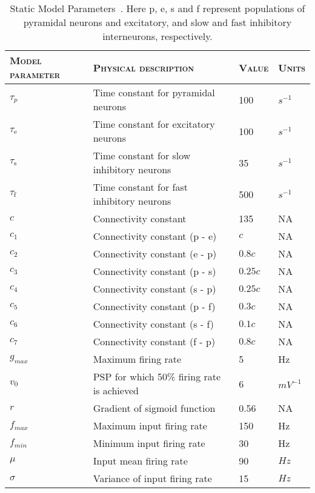 \singlespacing
\small
\begin{center}%
	\begin{table}
			\caption{Static Model Parameters~\citep{wendling2002epileptic}. Here p, e, s and f represent populations of pyramidal neurons and excitatory, and slow and fast inhibitory interneurons, respectively.}
		\begin{tabular}{||p{4cm}|p{6cm}|p{1.5cm}|p{1.2cm}||}\hline
			 \textsc{Model parameter}  & \textsc{Physical description} & \textsc{Value} & \textsc{Units}  \\\hline\hline
			 $\tau_{p}$ & Time constant for pyramidal neurons & 100 & $s^{-1}$\\\hline
			 $\tau_{\mathrm{e}}$ & Time constant for excitatory neurons & 100 & $s^{-1}$\\\hline
			 $\tau_{\mathrm{s}}$ & Time constant for slow inhibitory neurons & 35 & $s^{-1}$\\\hline
			 $\tau_{\mathrm{f}}$ & Time constant for fast inhibitory neurons & 500 & $s^{-1}$\\\hline
			 $c$ & Connectivity constant & 135 & NA\\\hline
			 $c_{1}$ & Connectivity constant (p - e) & $c$ & NA \\\hline
			 $c_{2}$ & Connectivity constant (e - p) & $0.8c$ & NA\\\hline
			 $c_{3}$ & Connectivity constant (p - s) & $0.25c$ & NA \\\hline
			 $c_{4}$ & Connectivity constant (s - p)& $0.25c$ & NA\\\hline
			 $c_{5}$ & Connectivity constant (p - f) & $0.3c$ & NA\\\hline
			 $c_{6}$ & Connectivity constant (s - f) & $0.1c$ & NA\\\hline
			 $c_{7}$ & Connectivity constant (f - p) & $0.8c$ & NA\\\hline
			 $g_{max}$ & Maximum firing rate & 5 & Hz \\\hline
			 $v_{0}$ & PSP for which 50\% firing rate is achieved & 6 & $mV^{-1}$\\\hline
			 $r$ & Gradient of sigmoid function & 0.56 & NA \\\hline
			 $f_{max}$ & Maximum input firing rate & 150 & Hz \\\hline
			 $f_{min}$ & Minimum input firing rate & 30 & Hz \\\hline
			 $\mu$ & Input mean firing rate & 90 & $Hz$\\\hline
			 $\sigma$ & Variance of input firing rate & 15 & $Hz$\\\hline\hline 
		\end{tabular}
		\label{tab: Static}
	\end{table}
\end{center}%
\onehalfspacing

